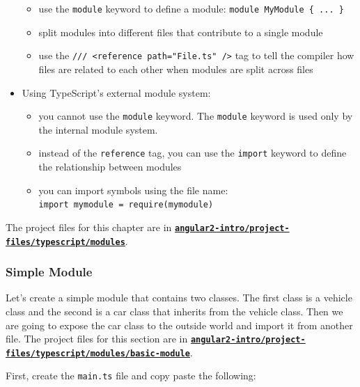 \documentclass[12pt,]{article}
\providecommand{\tightlist}{%
  \setlength{\itemsep}{0pt}\setlength{\parskip}{0pt}}
\begin{document}
\begin{itemize}
  \begin{itemize}
  \tightlist
  \item
    use the \texttt{module} keyword to define a module:
    \texttt{module\ MyModule\ \{\ ...\ \}}
  \item
    split modules into different files that contribute to a single
    module
  \item
    use the
    \texttt{///\ \textless{}reference\ path="File.ts"\ /\textgreater{}}
    tag to tell the compiler how files are related to each other when
    modules are split across files
  \end{itemize}
\item
  Using TypeScript's external module system:

  \begin{itemize}
  \tightlist
  \item
    you cannot use the \texttt{module} keyword. The \texttt{module}
    keyword is used only by the internal module system.
  \item
    instead of the \texttt{reference} tag, you can use the
    \texttt{import} keyword to define the relationship between modules
  \item
    you can import symbols using the file name:
    \texttt{import\ mymodule\ =\ require(\textquotesingle{}mymodule\textquotesingle{})}
  \end{itemize}
\end{itemize}

The project files for this chapter are in
\href{https://github.com/st32lth/angular2-intro/tree/master/project-files/typescript/modules}{\textbf{\texttt{angular2-intro/project-files/typescript/modules}}}.

\subsubsection{Simple Module}\label{simple-module}

Let's create a simple module that contains two classes. The first class
is a vehicle class and the second is a car class that inherits from the
vehicle class. Then we are going to expose the car class to the outside
world and import it from another file. The project files for this
section are in
\href{https://github.com/st32lth/angular2-intro/tree/master/project-files/typescript/modules/basic-module}{\textbf{\texttt{angular2-intro/project-files/typescript/modules/basic-module}}}.

First, create the \texttt{main.ts} file and copy paste the following:
\end{document}
